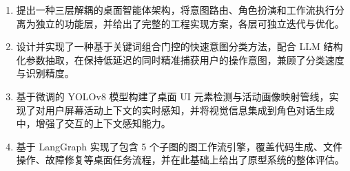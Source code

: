 \begin{enumerate}
    \item 提出一种三层解耦的桌面智能体架构，将意图路由、角色扮演和工作流执行分离为独立的功能层，并给出了完整的工程实现方案，各层可独立迭代与优化。
    \item 设计并实现了一种基于关键词组合门控的快速意图分类方法，配合 LLM 结构化参数抽取，在保持低延迟的同时精准捕获用户的操作意图，兼顾了分类速度与识别精度。
    \item 基于微调的 YOLOv8\cite{jocher2023yolov8} 模型构建了桌面 UI 元素检测与活动画像映射管线，实现了对用户屏幕活动上下文的实时感知，并将视觉信息集成到角色对话生成中，增强了交互的上下文感知能力。
    \item 基于 LangGraph\cite{langchain2024langgraph} 实现了包含 5 个子图的图工作流引擎，覆盖代码生成、文件操作、故障修复等桌面任务流程，并在此基础上给出了原型系统的整体评估。
\end{enumerate}
